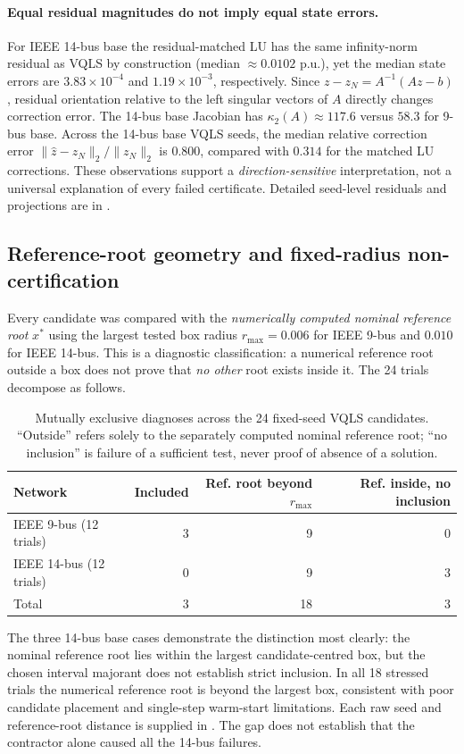 \documentclass[11pt,a4paper]{article}
\theoremstyle{remark}\newtheorem{remark}[theorem]{Remark}
\begin{document}
\paragraph{Equal residual magnitudes do not imply equal state errors.} For IEEE 14-bus base the residual-matched LU has the same infinity-norm residual as VQLS by construction (median $\approx0.0102$ p.u.), yet the median state errors are $3.83\times10^{-4}$ and $1.19\times10^{-3}$, respectively. Since $z-z_N=A^{-1}(Az-b)$, residual orientation relative to the left singular vectors of $A$ directly changes correction error. The 14-bus base Jacobian has $\kappa_2(A)\approx117.6$ versus $58.3$ for 9-bus base. Across the 14-bus base VQLS seeds, the median relative correction error $\|\widehat z-z_N\|_2/\|z_N\|_2$ is $0.800$, compared with $0.314$ for the matched LU corrections. These observations support a \emph{direction-sensitive} interpretation, not a universal explanation of every failed certificate. Detailed seed-level residuals and projections are in .

\subsection{Reference-root geometry and fixed-radius non-certification}
Every candidate was compared with the \emph{numerically computed nominal reference root} $x^*$ using the largest tested box radius $r_{\max}=0.006$ for IEEE 9-bus and $0.010$ for IEEE 14-bus. This is a diagnostic classification: a numerical reference root outside a box does not prove that \emph{no other} root exists inside it. The 24 trials decompose as follows.
\begin{table}[htbp]\centering\small
\caption{Mutually exclusive diagnoses across the 24 fixed-seed VQLS candidates. ``Outside'' refers solely to the separately computed nominal reference root; ``no inclusion'' is failure of a sufficient test, never proof of absence of a solution.}
\begin{tabular}{@{}lrrr@{}}\toprule
Network & Included & Ref. root beyond $r_{\max}$ & Ref. inside, no inclusion \\\midrule
IEEE 9-bus (12 trials) & 3 & 9 & 0 \\
IEEE 14-bus (12 trials) & 0 & 9 & 3 \\
Total & 3 & 18 & 3 \\\bottomrule
\end{tabular}\label{tab:geometry}
\end{table}
The three 14-bus base cases demonstrate the distinction most clearly: the nominal reference root lies within the largest candidate-centred box, but the chosen interval majorant does not establish strict inclusion. In all 18 stressed trials the numerical reference root is beyond the largest box, consistent with poor candidate placement and single-step warm-start limitations. Each raw seed and reference-root distance is supplied in . The gap does not establish that the contractor alone caused all the 14-bus failures.
\end{document}
